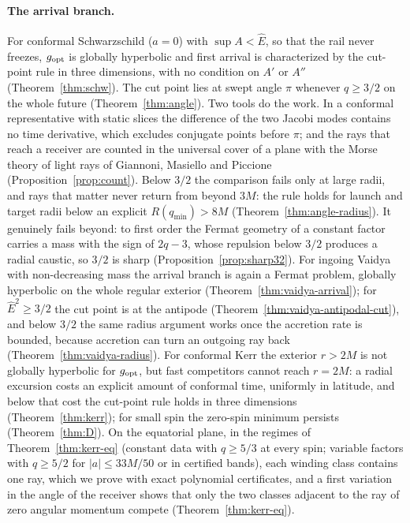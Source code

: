 \documentclass[aip,jmp,amsmath,amssymb,reprint]{revtex4-2}
\newcommand{\Ehat}{\hat E}
\newcommand{\gopt}{g_{\rm opt}}
\theoremstyle{plain}
\theoremstyle{definition}
\begin{document}
\paragraph{The arrival branch.} For conformal Schwarzschild ($a=0$) with $\sup A<\Ehat$, so that the
rail never freezes, $\gopt$ is globally hyperbolic and first arrival is characterized by the cut-point
rule in three dimensions, with no condition on $A'$ or $A''$ (Theorem~\ref{thm:schw}). The cut point
lies at swept angle $\pi$ whenever $q\ge3/2$ on the whole future (Theorem~\ref{thm:angle}). Two tools
do the work. In a conformal representative with static slices the difference of the two Jacobi
modes contains no time derivative, which excludes conjugate points before $\pi$; and the rays that
reach a receiver are counted in the universal cover of a plane with the Morse theory of light rays
of Giannoni, Masiello and Piccione~\cite{GiannoniMasielloPiccioneMorse}
(Proposition~\ref{prop:count}). Below $3/2$ the comparison fails only at large radii, and rays that
matter never return from beyond $3M$: the rule holds for launch and target radii below an explicit
$R(q_{\min})>8M$ (Theorem~\ref{thm:angle-radius}). It genuinely fails beyond: to first order the
Fermat geometry of a constant factor carries a mass with the sign of $2q-3$, whose repulsion below
$3/2$ produces a radial caustic, so $3/2$ is sharp (Proposition~\ref{prop:sharp32}). For ingoing
Vaidya with non-decreasing mass the arrival branch is again a Fermat problem, globally hyperbolic on
the whole regular exterior (Theorem~\ref{thm:vaidya-arrival}); for $\Ehat^2\ge3/2$ the cut point is
at the antipode (Theorem~\ref{thm:vaidya-antipodal-cut}), and below $3/2$ the same radius argument
works once the accretion rate is bounded, because accretion can turn an outgoing ray back
(Theorem~\ref{thm:vaidya-radius}). For conformal Kerr the exterior $r>2M$ is not globally hyperbolic
for $\gopt$, but fast competitors cannot reach $r=2M$: a radial excursion costs an explicit amount of
conformal time, uniformly in latitude, and below that cost the cut-point rule holds in three
dimensions (Theorem~\ref{thm:kerr}); for small spin the zero-spin minimum persists
(Theorem~\ref{thm:D}). On the equatorial plane, in the regimes of Theorem~\ref{thm:kerr-eq} (constant data with
$q\ge5/3$ at every spin; variable factors with $q\ge5/2$ for $|a|\le33M/50$ or in certified bands), each winding
class contains one ray, which we prove with exact polynomial certificates, and a first variation in
the angle of the receiver shows that only the two classes adjacent to the ray of zero angular
momentum compete (Theorem~\ref{thm:kerr-eq}).
\end{document}
